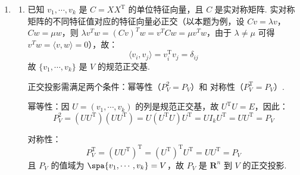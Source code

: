 \begin{enumerate}
\begin{enumerate}
        任取 $v\in W_1^\perp \cap W_2^\perp$，对 $w_1 + w_2\in W_1 + W_2$，$\langle v, w_1 + w_2\rangle = \langle v, w_1\rangle + \langle v, w_2\rangle = 0$，故$v\in(W_1 + W_2)^\perp$.

        \item 对 $W_1^\perp, W_2^\perp$ 用上一问得 $(W_1^\perp + W_2^\perp)^\perp = W_1 \cap W_2$，两边取正交补即证.
    \end{enumerate}

    \item \begin{enumerate}
        \item 已知 $v_1,\cdots,v_k$ 是 $C=XX^\mathrm{T}$ 的单位特征向量，且 $C$ 是实对称矩阵. 实对称矩阵的不同特征值对应的特征向量必正交（以本题为例，设 $Cv=\lambda v$，$Cw=\mu w$，则 $\lambda v^{T}w=(Cv)^{T}w=v^{T}Cw=\mu v^{T}w$，由于 $\lambda\neq\mu$ 可得 $v^{T}w=\langle v,w \rangle=0$），故：
        \[
            \langle v_i, v_j \rangle = v_i^\mathrm{T} v_j = \delta_{ij}
        \]
        故 $\{v_1,\cdots,v_k\}$ 是 $V$ 的规范正交基.

        正交投影需满足两个条件：幂等性（$P_V^2=P_V$）和 对称性（$P_V^\mathrm{T}=P_V$）.

        幂等性：因 $U=(v_1,\cdots,v_k)$ 的列是规范正交基，故 $U^\mathrm{T} U=E$，因此：
        \[
            P_V^2 = (UU^\mathrm{T})(UU^\mathrm{T}) = U(U^\mathrm{T} U)U^\mathrm{T} = UI_k U^\mathrm{T} = UU^\mathrm{T} = P_V
        \]

        对称性：
        \[
            P_V^\mathrm{T} = (UU^\mathrm{T})^\mathrm{T} = (U^\mathrm{T})^\mathrm{T} U^\mathrm{T} = UU^\mathrm{T} = P_V
        \]
        且 $P_V$ 的值域为 $\spa\{v_1,\cdots,v_k\}=V$，故 $P_V$ 是 $\mathbf{R}^n$ 到 $V$ 的正交投影.


\end{enumerate}
\end{enumerate}
